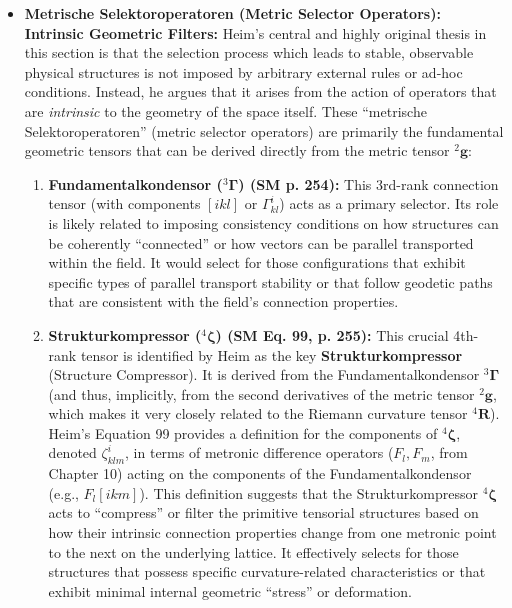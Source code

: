 \documentclass[12pt]{article}
\newcommand{\q}[1]{\enquote{#1}}
\newcommand{\kompositionsfeld}{{}^2\mathbf{g}}
\newcommand{\fundamentalkondensor}{{}^3\bm{\Gamma}}
\newcommand{\strukturkompressor}{{}^4\bm{\zeta}}
\begin{document}
\begin{itemize}
    \item \textbf{Metrische Selektoroperatoren (Metric Selector Operators): Intrinsic Geometric Filters:}
    Heim's central and highly original thesis in this section is that the selection process which leads to stable, observable physical structures is not imposed by arbitrary external rules or ad-hoc conditions. Instead, he argues that it arises from the action of operators that are \textit{intrinsic} to the geometry of the space itself. These \q{metrische Selektoroperatoren} (metric selector operators) are primarily the fundamental geometric tensors that can be derived directly from the metric tensor \( \kompositionsfeld \):
    \begin{enumerate}
        \item \textbf{Fundamentalkondensor (\( \fundamentalkondensor \)) (SM p. 254):} This 3rd-rank connection tensor (with components \( [ikl] \) or \( \Gamma^i_{kl} \)) acts as a primary selector. Its role is likely related to imposing consistency conditions on how structures can be coherently \q{connected} or how vectors can be parallel transported within the field. It would select for those configurations that exhibit specific types of parallel transport stability or that follow geodetic paths that are consistent with the field's connection properties.
        \item \textbf{Strukturkompressor (\( \strukturkompressor \)) (SM Eq. 99, p. 255):} This crucial 4th-rank tensor is identified by Heim as the key \textbf{Strukturkompressor} (Structure Compressor). It is derived from the Fundamentalkondensor \( \fundamentalkondensor \) (and thus, implicitly, from the second derivatives of the metric tensor \( \kompositionsfeld \), which makes it very closely related to the Riemann curvature tensor \( {}^4\mathbf{R} \)). Heim's Equation 99 provides a definition for the components of \( \strukturkompressor \), denoted \( \zeta^i_{klm} \), in terms of metronic difference operators (\( F_l, F_m \), from Chapter 10) acting on the components of the Fundamentalkondensor (e.g., \( F_l[ikm] \)). This definition suggests that the Strukturkompressor \( \strukturkompressor \) acts to \q{compress} or filter the primitive tensorial structures based on how their intrinsic connection properties change from one metronic point to the next on the underlying lattice. It effectively selects for those structures that possess specific curvature-related characteristics or that exhibit minimal internal geometric \q{stress} or deformation.
        \begin{equation} 

\end{equation}
\end{enumerate}
\end{itemize}
\end{document}
